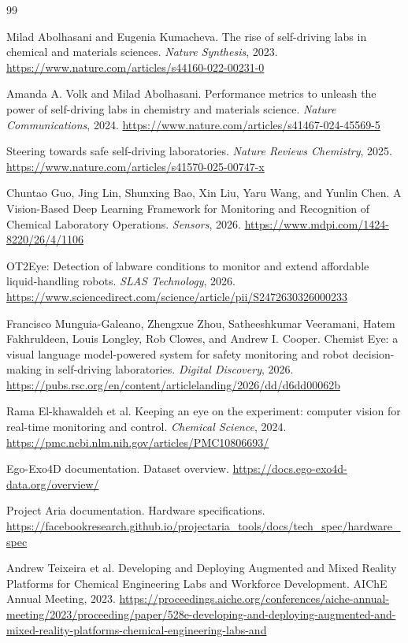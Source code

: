 \documentclass[11pt]{article}
\begin{document}
\begin{thebibliography}{99}
\raggedright
\small

Milad Abolhasani and Eugenia Kumacheva.
The rise of self-driving labs in chemical and materials sciences.
\emph{Nature Synthesis}, 2023.
\url{https://www.nature.com/articles/s44160-022-00231-0}

Amanda A. Volk and Milad Abolhasani.
Performance metrics to unleash the power of self-driving labs in chemistry and materials science.
\emph{Nature Communications}, 2024.
\url{https://www.nature.com/articles/s41467-024-45569-5}

Steering towards safe self-driving laboratories.
\emph{Nature Reviews Chemistry}, 2025.
\url{https://www.nature.com/articles/s41570-025-00747-x}

Chuntao Guo, Jing Lin, Shunxing Bao, Xin Liu, Yaru Wang, and Yunlin Chen.
A Vision-Based Deep Learning Framework for Monitoring and Recognition of Chemical Laboratory Operations.
\emph{Sensors}, 2026.
\url{https://www.mdpi.com/1424-8220/26/4/1106}

OT2Eye: Detection of labware conditions to monitor and extend affordable liquid-handling robots.
\emph{SLAS Technology}, 2026.
\url{https://www.sciencedirect.com/science/article/pii/S2472630326000233}

Francisco Munguia-Galeano, Zhengxue Zhou, Satheeshkumar Veeramani, Hatem Fakhruldeen, Louis Longley, Rob Clowes, and Andrew I. Cooper.
Chemist Eye: a visual language model-powered system for safety monitoring and robot decision-making in self-driving laboratories.
\emph{Digital Discovery}, 2026.
\url{https://pubs.rsc.org/en/content/articlelanding/2026/dd/d6dd00062b}

Rama El-khawaldeh et al.
Keeping an eye on the experiment: computer vision for real-time monitoring and control.
\emph{Chemical Science}, 2024.
\url{https://pmc.ncbi.nlm.nih.gov/articles/PMC10806693/}

Ego-Exo4D documentation.
Dataset overview.
\url{https://docs.ego-exo4d-data.org/overview/}

Project Aria documentation.
Hardware specifications.
\url{https://facebookresearch.github.io/projectaria_tools/docs/tech_spec/hardware_spec}

Andrew Teixeira et al.
Developing and Deploying Augmented and Mixed Reality Platforms for Chemical Engineering Labs and Workforce Development.
AIChE Annual Meeting, 2023.
\url{https://proceedings.aiche.org/conferences/aiche-annual-meeting/2023/proceeding/paper/528e-developing-and-deploying-augmented-and-mixed-reality-platforms-chemical-engineering-labs-and}


\end{thebibliography}
\end{document}
